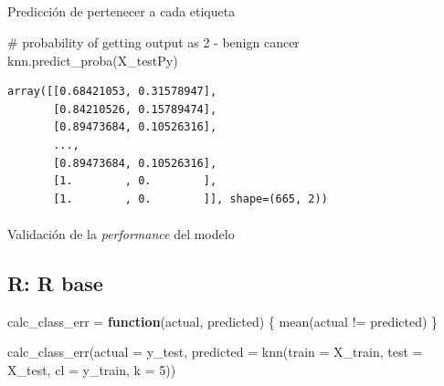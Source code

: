 \documentclass[
  letterpaper,
  DIV=11,
  numbers=noendperiod]{scrartcl}
\makeatletter
\let\oldparagraph\paragraph
\renewcommand{\paragraph}{
    \@ifstar
      \xxxParagraphStar
      \xxxParagraphNoStar
  }
\newcommand{\xxxParagraphStar}[1]{\oldparagraph*{#1}\mbox{}}
\newcommand{\xxxParagraphNoStar}[1]{\oldparagraph{#1}\mbox{}}
\let\oldsubparagraph\subparagraph
\renewcommand{\subparagraph}{
    \@ifstar
      \xxxSubParagraphStar
      \xxxSubParagraphNoStar
  }
\newcommand{\xxxSubParagraphStar}[1]{\oldsubparagraph*{#1}\mbox{}}
\newcommand{\xxxSubParagraphNoStar}[1]{\oldsubparagraph{#1}\mbox{}}
\newenvironment{Shaded}{\begin{snugshade}}{\end{snugshade}}
\newcommand{\AttributeTok}[1]{\textcolor[rgb]{0.40,0.45,0.13}{#1}}
\newcommand{\CommentTok}[1]{\textcolor[rgb]{0.37,0.37,0.37}{#1}}
\newcommand{\ControlFlowTok}[1]{\textcolor[rgb]{0.00,0.23,0.31}{\textbf{#1}}}
\newcommand{\DecValTok}[1]{\textcolor[rgb]{0.68,0.00,0.00}{#1}}
\newcommand{\FunctionTok}[1]{\textcolor[rgb]{0.28,0.35,0.67}{#1}}
\newcommand{\NormalTok}[1]{\textcolor[rgb]{0.00,0.23,0.31}{#1}}
\newcommand{\OtherTok}[1]{\textcolor[rgb]{0.00,0.23,0.31}{#1}}
\newcommand{\SpecialCharTok}[1]{\textcolor[rgb]{0.37,0.37,0.37}{#1}}
\makeatother
\begin{document}
\subparagraph{Predicción de pertenecer a cada
etiqueta}\label{predicciuxf3n-de-pertenecer-a-cada-etiqueta}

\begin{Shaded}
\begin{Highlighting}[]
\CommentTok{\# probability of getting output as 2 {-} benign cancer}
\NormalTok{knn.predict\_proba(X\_testPy)}
\end{Highlighting}
\end{Shaded}

\begin{verbatim}
array([[0.68421053, 0.31578947],
       [0.84210526, 0.15789474],
       [0.89473684, 0.10526316],
       ...,
       [0.89473684, 0.10526316],
       [1.        , 0.        ],
       [1.        , 0.        ]], shape=(665, 2))
\end{verbatim}

\paragraph{\texorpdfstring{Validación de la \emph{performance} del
modelo}{Validación de la performance del modelo}}\label{validaciuxf3n-de-la-performance-del-modelo}

\subsection{R: R base}

\begin{Shaded}
\begin{Highlighting}[]
\NormalTok{calc\_class\_err }\OtherTok{=} \ControlFlowTok{function}\NormalTok{(actual, predicted) \{}
  \FunctionTok{mean}\NormalTok{(actual }\SpecialCharTok{!=}\NormalTok{ predicted)}
\NormalTok{\}}
\end{Highlighting}
\end{Shaded}

\begin{Shaded}
\begin{Highlighting}[]
\FunctionTok{calc\_class\_err}\NormalTok{(}\AttributeTok{actual    =}\NormalTok{ y\_test,}
               \AttributeTok{predicted =} \FunctionTok{knn}\NormalTok{(}\AttributeTok{train =}\NormalTok{ X\_train,}
                               \AttributeTok{test  =}\NormalTok{ X\_test,}
                               \AttributeTok{cl    =}\NormalTok{ y\_train,}
                               \AttributeTok{k     =} \DecValTok{5}\NormalTok{))}
\end{Highlighting}
\end{Shaded}
\end{document}
